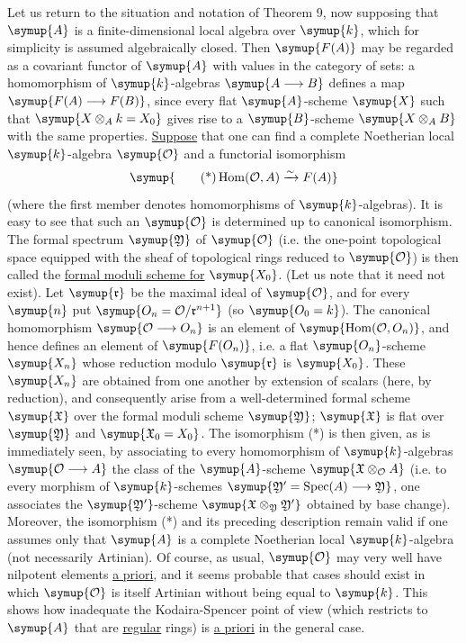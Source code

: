 Let us return to the situation and notation of Theorem 9, now supposing that $\symup{A}$ is a
finite-dimensional local algebra over $\symup{k}$, which for simplicity is assumed
algebraically closed. Then $\symup{F(A)}$ may be regarded as a covariant functor of
$\symup{A}$ with values in the category of sets: a homomorphism of $\symup{k}$-algebras
$\symup{A\longrightarrow B}$ defines a map $\symup{F(A)\longrightarrow F(B)}$, since every
flat $\symup{A}$-scheme $\symup{X}$ such that $\symup{X\otimes_A k=X_0}$ gives rise to a $\symup{B}$-scheme
$\symup{X\otimes_A B}$ with the same properties. \uline{Suppose} that one can find a complete
Noetherian local $\symup{k}$-algebra $\symup{\mathcal O}$ and a functorial isomorphism
\begin{equation}
  \symup{\tag{*}
  \operatorname{Hom}(\mathcal O,A)\xrightarrow{\sim}F(A)}
\end{equation}
(where the first member denotes homomorphisms of $\symup{k}$-algebras). It is easy to
see that such an $\symup{\mathcal O}$ is determined up to canonical isomorphism. The
formal spectrum $\symup{\mathfrak Y}$ of $\symup{\mathcal O}$ (i.e. the one-point topological
space equipped with the sheaf of topological rings reduced to $\symup{\mathcal O}$)
is then called the \uline{formal moduli scheme for} $\symup{X_0}$. (Let us note that it need not exist).
Let $\symup{\mathfrak r}$ be the maximal ideal of $\symup{\mathcal O}$, and for every $\symup{n}$ put
$\symup{O_n=\mathcal O/\mathfrak r^{n+1}}$ (so $\symup{O_0=k}$). The
canonical homomorphism $\symup{\mathcal O\longrightarrow O_n}$ is an element
of $\symup{\operatorname{Hom}(\mathcal O,O_n)}$, and hence defines an element
of $\symup{F(O_n)}$, i.e. a flat $\symup{O_n}$-scheme $\symup{X_n}$ whose reduction
modulo $\symup{\mathfrak r}$ is $\symup{X_0}$. These $\symup{X_n}$ are obtained from one another by
extension of scalars (here, by reduction), and consequently arise from a
well-determined formal scheme $\symup{\mathfrak X}$ over the formal moduli scheme
$\symup{\mathfrak Y}$; $\symup{\mathfrak X}$ is flat over $\symup{\mathfrak Y}$ and
$\symup{\mathfrak X_0=X_0}$. The isomorphism (*) is then given, as is immediately
seen, by associating to every homomorphism of $\symup{k}$-algebras
$\symup{\mathcal O\longrightarrow A}$ the class of the $\symup{A}$-scheme
$\symup{\mathfrak X\otimes_{\mathcal O}A}$ (i.e. to every morphism of $\symup{k}$-schemes
$\symup{\mathfrak Y'=\operatorname{Spec}(A)\longrightarrow\mathfrak Y}$, one associates the
$\symup{\mathfrak Y'}$-scheme $\symup{\mathfrak X\otimes_{\mathfrak Y}\mathfrak Y'}$ obtained by base change).
Moreover, the isomorphism (*) and its preceding description remain valid if
one assumes only that $\symup{A}$ is a complete Noetherian local $\symup{k}$-algebra (not
necessarily Artinian). Of course, as usual, $\symup{\mathcal O}$ may very well have
nilpotent elements \uline{a priori}, and it seems probable that cases should
exist in which $\symup{\mathcal O}$ is itself Artinian without being equal to $\symup{k}$.
This shows how inadequate the Kodaira-Spencer point of view (which restricts
to $\symup{A}$ that are \uline{regular} rings) is \uline{a priori} in the general case.

